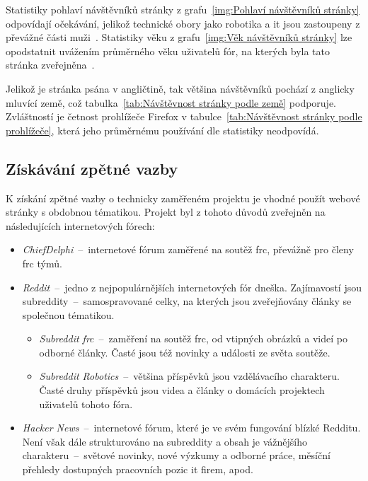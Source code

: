 \documentclass[a4paper, 12pt]{article}
\begin{document}
  Statistiky pohlaví návštěvníků stránky z grafu~\ref{img:Pohlaví návštěvníků stránky} odpovídají očekávání, jelikož technické obory jako robotika a \gls{it} jsou zastoupeny z převážné části muži~\cite{women-in-stem}. Statistiky věku z grafu~\ref{img:Věk návštěvníků stránky} lze opodstatnit uvážením průměrného věku uživatelů fór, na kterých byla tato stránka zveřejněna~\cite{reddit-demographics}.

  Jelikož je stránka psána v angličtině, tak většina návštěvníků pochází z anglicky mluvící země, což tabulka~\ref{tab:Návštěvnost stránky podle země} podporuje. Zvláštností je četnost prohlížeče Firefox v tabulce~\ref{tab:Návštěvnost stránky podle prohlížeče}, která jeho průměrnému používání dle statistiky \cite{browser-statistics} neodpovídá.


  \subsection{Získávání zpětné vazby}
  K získání zpětné vazby o technicky zaměřeném projektu je vhodné použít webové stránky s obdobnou tématikou. Projekt byl z tohoto důvodů zveřejněn na následujících internetových fórech:

  {\parskip=0pt
  \begin{itemize}[topsep=\itemsep]
    \item \emph{ChiefDelphi}~--~internetové fórum zaměřené na soutěž \gls{frc}, převážně pro členy \gls{frc} týmů.
    \item \emph{Reddit}~--~jedno z nejpopulárnějších internetových fór dneška. Zajímavostí jsou subreddity~--~samospravované celky, na kterých jsou zveřejňovány články se společnou tématikou.
    \begin{itemize}[topsep=0pt]
      \item \emph{Subreddit \gls{frc}}~--~zaměření na soutěž \gls{frc}, od vtipných obrázků a videí po odborné články. Časté jsou též novinky a události ze světa soutěže.
      \item \emph{Subreddit Robotics}~--~většina příspěvků jsou vzdělávacího charakteru. Časté druhy příspěvků jsou videa a články o domácích projektech uživatelů tohoto fóra.
    \end{itemize}
    \item \emph{Hacker News}~--~internetové fórum, které je ve svém fungování blízké Redditu. Není však dále strukturováno na subreddity a obsah je vážnějšího charakteru~--~světové novinky, nové výzkumy a odborné práce, měsíční přehledy dostupných pracovních pozic \gls{it} firem, apod.
  \end{itemize}}
\end{document}
